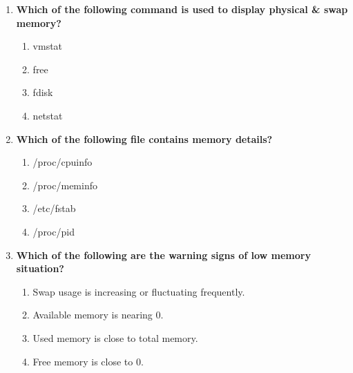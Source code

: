 \begin{flushleft}
\begin{enumerate}
		\item \textbf{Which of the following command is used to display physical \& swap memory?}
		\begin{enumerate}[label=(\alph*)]
			\item vmstat  
			\item free    %
			\item fdisk
			\item netstat
		\end{enumerate}
		\bigskip
		\bigskip	
		
		
		\item \textbf{Which of the following file contains memory details?}
		\begin{enumerate}[label=(\alph*)]
			\item /proc/cpuinfo  
			\item /proc/meminfo         %
			\item /etc/fstab
			\item /proc/pid
		\end{enumerate}
		\bigskip
		\bigskip	


		\item \textbf{Which of the following are the warning signs of low memory situation?}
		\begin{enumerate}[label=(\alph*)]
			\item Swap usage is increasing or fluctuating frequently. %
			\item Available memory is nearing 0.      %
			\item Used memory is close to total memory.
			\item Free memory is close to 0.
		\end{enumerate}
		\bigskip
		\bigskip	
		
	\end{enumerate}
	
	
\end{flushleft}

\newpage

\afterpage{\blankpage}